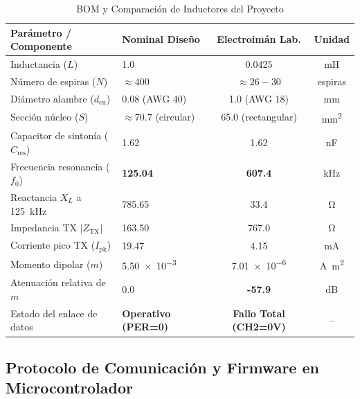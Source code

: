 \begin{table}[htbp]
\caption{BOM y Comparación de Inductores del Proyecto}
\label{tab:componentes}
\centering
\begin{tabular}{llcc}
\toprule
\textbf{Parámetro / Componente} & \textbf{Nominal Diseño} & \textbf{Electroimán Lab.} & \textbf{Unidad} \\
\midrule
Inductancia ($L$) & \num{1.0} & \num{0.0425} & \si{\milli\henry} \\
Número de espiras ($N$) & $\approx 400$ & $\approx 26-30$ & espiras \\
Diámetro alambre ($d_{\text{cu}}$) & \num{0.08} (AWG 40) & \num{1.0} (AWG 18) & \si{\milli\meter} \\
Sección núcleo ($S$) & $\approx 70.7$ (circular) & \num{65.0} (rectangular) & \si{\milli\meter\squared} \\
Capacitor de sintonía ($C_{\text{res}}$) & \num{1.62} & \num{1.62} & \si{\nano\farad} \\
Frecuencia resonancia ($f_0$) & \textbf{125.04} & \textbf{607.4} & \si{\kilo\hertz} \\
Reactancia $X_L$ a \SI{125}{\kilo\hertz} & \num{785.65} & \num{33.4} & \si{\ohm} \\
Impedancia TX $|Z_{\text{TX}}|$ & \num{163.50} & \num{767.0} & \si{\ohm} \\
Corriente pico TX ($I_{\text{pk}}$) & \num{19.47} & \num{4.15} & \si{\milli\ampere} \\
Momento dipolar ($m$) & \num{5.50e-3} & \num{7.01e-6} & \si{\ampere\meter\squared} \\
Atenuación relativa de $m$ & $0.0$ & \textbf{-57.9} & \si{\deci\bel} \\
Estado del enlace de datos & \textbf{Operativo (PER=0)} & \textbf{Fallo Total (CH2=0V)} & -- \\
\bottomrule
\end{tabular}
\end{table}

\subsection{Protocolo de Comunicación y Firmware en Microcontrolador}
\label{subsec:firmware}

